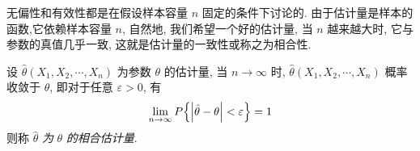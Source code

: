 无偏性和有效性都是在假设样本容量 $n$ 固定的条件下讨论的.
由于估计量是样本的函数,它依赖样本容量 $n$, 自然地, 我们希望一个好的估计量, 当 $n$ 越来越大时, 它与参数的真值几乎一致, 
这就是估计量的一致性或称之为相合性.

\begin{definition}[一致性]
    设 $ \hat{\theta}\left(X_{1}, X_{2}, \cdots, X_{n}\right) $ 为参数 $ \theta $ 的估计量, 当 $ n \to \infty $ 时, $\hat{\theta}\left(X_{1}, X_{2}, \cdots, X_{n}\right) $ 概率收敛于
    $ \theta $, 即对于任意 $ \varepsilon>0 $, 有
    $$\lim _{n \to \infty} P\qty{\qty|\hat{\theta}-\theta|<\varepsilon}=1$$
    则称 $ \hat{\theta} $ \textit{为} $ \theta $ \textit{的相合估计量}.
\end{definition}

